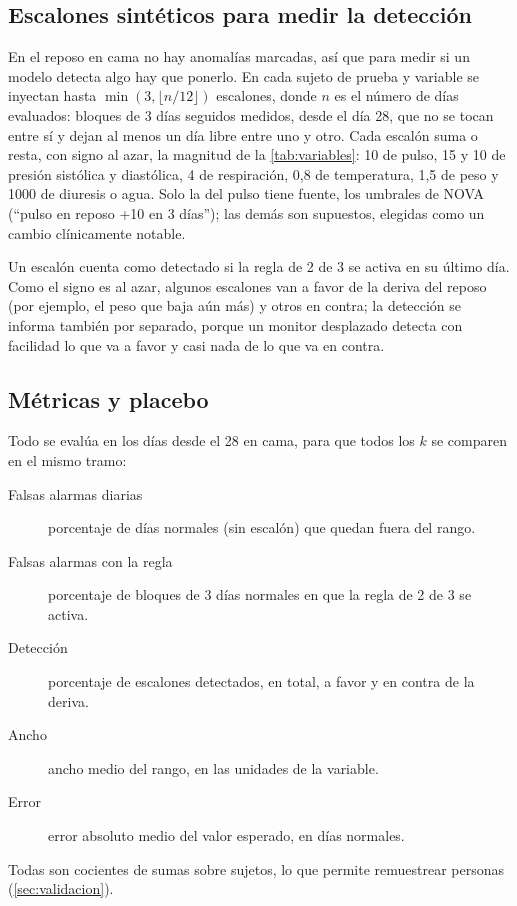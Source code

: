 \subsection{Escalones sintéticos para medir la detección}\label{sec:escalones}

En el reposo en cama no hay anomalías marcadas, así que para medir si un modelo detecta algo hay que ponerlo. En cada
sujeto de prueba y variable se inyectan hasta $\min(3, \lfloor n/12 \rfloor)$ escalones, donde $n$ es el número de días
evaluados: bloques de 3 días seguidos medidos, desde el día 28, que no se tocan entre sí y dejan al menos un día libre
entre uno y otro. Cada escalón suma o resta, con signo al azar, la magnitud de la \cref{tab:variables}: 10 de
pulso, 15 y 10 de presión sistólica y diastólica, 4 de respiración, 0,8 de temperatura,
1,5 de peso y 1000 de diuresis o agua. Solo la del pulso tiene fuente, los umbrales de NOVA
(\enquote{pulso en reposo +10 en 3 días}); las demás son supuestos, elegidas como un cambio clínicamente
notable.

Un escalón cuenta como detectado si la regla de 2 de 3 se activa en su último día. Como el signo es al azar, algunos
escalones van a favor de la deriva del reposo (por ejemplo, el peso que baja aún más) y otros en contra; la detección
se informa también por separado, porque un monitor desplazado detecta con facilidad lo que va a favor y casi nada de lo
que va en contra.

\subsection{Métricas y placebo}

Todo se evalúa en los días desde el 28 en cama, para que todos los $k$ se comparen en el mismo tramo:
\begin{description}
\item[Falsas alarmas diarias] porcentaje de días normales (sin escalón) que quedan fuera del rango.
\item[Falsas alarmas con la regla] porcentaje de bloques de 3 días normales en que la regla de 2 de 3 se activa.
\item[Detección] porcentaje de escalones detectados, en total, a favor y en contra de la deriva.
\item[Ancho] ancho medio del rango, en las unidades de la variable.
\item[Error] error absoluto medio del valor esperado, en días normales.
\end{description}
Todas son cocientes de sumas sobre sujetos, lo que permite remuestrear personas (\cref{sec:validacion}).

